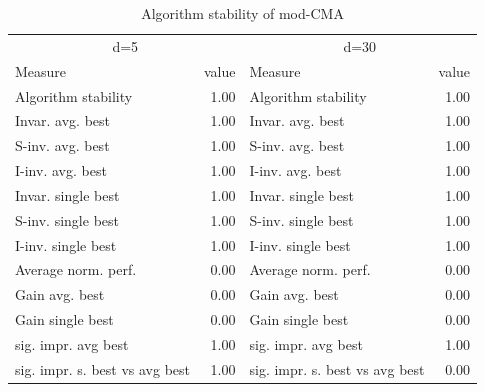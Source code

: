 \begin{table}
\caption{Algorithm stability of mod-CMA}
\begin{tabular}{lrlr}
\toprule
\multicolumn{2}{c}{d=5} & \multicolumn{2}{c}{d=30} \\
Measure & value & Measure & value \\
\midrule
Algorithm stability & 1.00 & Algorithm stability & 1.00 \\
Invar. avg. best & 1.00 & Invar. avg. best & 1.00 \\
S-inv. avg. best & 1.00 & S-inv. avg. best & 1.00 \\
I-inv. avg. best & 1.00 & I-inv. avg. best & 1.00 \\
Invar. single best & 1.00 & Invar. single best & 1.00 \\
S-inv. single best & 1.00 & S-inv. single best & 1.00 \\
I-inv. single best & 1.00 & I-inv. single best & 1.00 \\
Average norm. perf. & 0.00 & Average norm. perf. & 0.00 \\
Gain avg. best & 0.00 & Gain avg. best & 0.00 \\
Gain single best & 0.00 & Gain single best & 0.00 \\
sig. impr. avg best & 1.00 & sig. impr. avg best & 1.00 \\
sig. impr. s. best vs avg best & 1.00 & sig. impr. s. best vs avg best & 0.00 \\
\bottomrule
\end{tabular}
\end{table}
